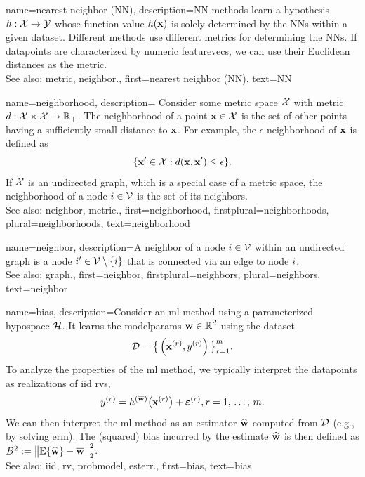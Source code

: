 {name={nearest neighbor (NN)},
	description={NN methods learn a \gls{hypothesis} 
		$h: \mathcal{X} \rightarrow \mathcal{Y}$ whose \gls{function} value $h({\bf x})$ 
		is solely determined by the NNs within a given \gls{dataset}. Different 
		methods use different \glspl{metric} for determining the NNs. If \glspl{datapoint} 
		are characterized by numeric \glspl{featurevec}, we can use their Euclidean distances as 
		the \gls{metric}.
					\\ 
		See also: \gls{metric}, \gls{neighbor}.},
	first={nearest neighbor (NN)},
	text={NN} 
}

 {name={neighborhood},
 	description={
 	Consider some \gls{metric} space $\mathcal{X}$ with \gls{metric} 
	$d: \mathcal{X} \times \mathcal{X} \rightarrow \mathbb{R}_{+}$.	
 	The neighborhood of a point ${\bf x} \in \mathcal{X}$ 
 	is the set of other points having a sufficiently small distance to ${\bf x}$. 
 	For example, the $\epsilon$-neighborhood of ${\bf x}$ is defined as
 	$$ \{ {\bf x}' \in \mathcal{X} : d({\bf x}, {\bf x}') \leq \epsilon \}.$$
	If $\mathcal{X}$ is an undirected \gls{graph}, which is a special case of 
 	a \gls{metric} space, the neighborhood of a node $i \in \mathcal{V}$ 
 	is the set of its \glspl{neighbor}.
 				\\ 
 	See also: \gls{neighbor}, \gls{metric}.},
 	first={neighborhood},
	firstplural={neighborhoods},
 	plural={neighborhoods},
 	text={neighborhood} 
 }


{name={neighbor},
	description={A neighbor of a node $i \in \mathcal{V}$ 
		within an undirected \gls{graph} is a node $i' \in \mathcal{V} \setminus \{ i\}$ 
		that is connected via an edge to node $i$.
				\\ 
		See also: \gls{graph}.},
	first={neighbor},
	firstplural={neighbors}, 
	plural={neighbors}, 
	text={neighbor} 
}

{name={bias},
	description={Consider an \gls{ml} method using a parameterized \gls{hypospace} $\mathcal{H}$. 
		It learns the \glspl{modelparam} ${\bf w} \in \mathbb{R}^{d}$ using the \gls{dataset} 
		$$\mathcal{D}=\big\{ \left( {\bf x}^{(r)},y^{(r)} \right) \big\}_{r=1}^{m}.$$ 
		To analyze the properties of the \gls{ml} method, we typically interpret the \glspl{datapoint} as \glspl{realization} of \gls{iid} \glspl{rv}, 
		$$y^{(r)} = h^{(\overline{{\bf w}})}\big( {\bf x}^{(r)} \big) + \bm{\varepsilon}^{(r)}, r=1, \,\ldots, \,m.$$ 
		We can then interpret the \gls{ml} method as an estimator $\widehat{{\bf w}}$ 
		computed from $\mathcal{D}$ (e.g., by solving \gls{erm}). The (squared) bias incurred by 
		the estimate $\widehat{{\bf w}}$ is then defined as $B^{2} := \big\| \mathbb{E} \{ \widehat{{\bf w}}  \}- \overline{{\bf w}}\big\|_{2}^{2}$.
					\\ 
		See also: \gls{iid}, \gls{rv}, \gls{probmodel}, \gls{esterr}.},
	first={bias},
	text={bias} 
}

